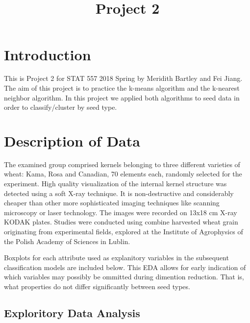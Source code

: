 \documentclass[]{article}
\title{Project 2}
\author{}
\date{}
\begin{document}
\maketitle

\section{Introduction}\label{introduction}

This is Project 2 for STAT 557 2018 Spring by Meridith Bartley and Fei
Jiang. The aim of this project is to practice the k-means algorithm and
the k-nearest neighbor algorithm. In this project we applied both
algorithms to seed data in order to classify/cluster by seed type.

\section{Description of Data}\label{description-of-data}

The examined group comprised kernels belonging to three different
varieties of wheat: Kama, Rosa and Canadian, 70 elements each, randomly
selected for the experiment. High quality visualization of the internal
kernel structure was detected using a soft X-ray technique. It is
non-destructive and considerably cheaper than other more sophisticated
imaging techniques like scanning microscopy or laser technology. The
images were recorded on 13x18 cm X-ray KODAK plates. Studies were
conducted using combine harvested wheat grain originating from
experimental fields, explored at the Institute of Agrophysics of the
Polish Academy of Sciences in Lublin.

Boxplots for each attribute used as explanitory variables in the
subsequent classification models are included below. This EDA allows for
early indication of which variables may possibly be ommitted during
dimention reduction. That is, what properties do not differ
significantly between seed types.

\subsection{Exploritory Data Analysis}\label{exploritory-data-analysis}
\end{document}
